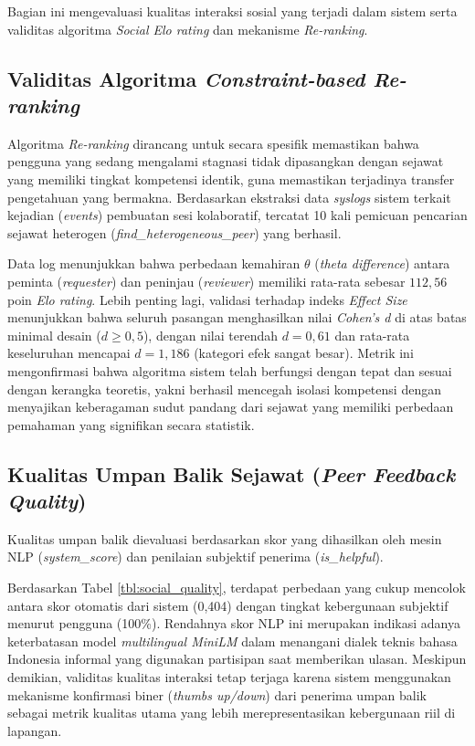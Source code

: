 Bagian ini mengevaluasi kualitas interaksi sosial yang terjadi dalam sistem serta validitas algoritma \textit{Social Elo rating} dan mekanisme \textit{Re-ranking}.

\subsection{Validitas Algoritma \textit{Constraint-based Re-ranking}}
Algoritma \textit{Re-ranking} dirancang untuk secara spesifik memastikan bahwa pengguna yang sedang mengalami stagnasi tidak dipasangkan dengan sejawat yang memiliki tingkat kompetensi identik, guna memastikan terjadinya transfer pengetahuan yang bermakna. Berdasarkan ekstraksi data \textit{syslogs} sistem terkait kejadian (\textit{events}) pembuatan sesi kolaboratif, tercatat 10 kali pemicuan pencarian sejawat heterogen (\textit{find\_heterogeneous\_peer}) yang berhasil. 

Data log menunjukkan bahwa perbedaan kemahiran $\theta$ (\textit{theta difference}) antara peminta (\textit{requester}) dan peninjau (\textit{reviewer}) memiliki rata-rata sebesar $112,56$ poin \textit{Elo rating}. Lebih penting lagi, validasi terhadap indeks \textit{Effect Size} menunjukkan bahwa seluruh pasangan menghasilkan nilai \textit{Cohen's d} di atas batas minimal desain ($d \geq 0,5$), dengan nilai terendah $d = 0,61$ dan rata-rata keseluruhan mencapai $d = 1,186$ (kategori efek sangat besar). Metrik ini mengonfirmasi bahwa algoritma sistem telah berfungsi dengan tepat dan sesuai dengan kerangka teoretis, yakni berhasil mencegah isolasi kompetensi dengan menyajikan keberagaman sudut pandang dari sejawat yang memiliki perbedaan pemahaman yang signifikan secara statistik.

\subsection{Kualitas Umpan Balik Sejawat (\textit{Peer Feedback Quality})}
Kualitas umpan balik dievaluasi berdasarkan skor yang dihasilkan oleh mesin NLP (\textit{system\_score}) dan penilaian subjektif penerima (\textit{is\_helpful}).



Berdasarkan Tabel \ref{tbl:social_quality}, terdapat perbedaan yang cukup mencolok antara skor otomatis dari sistem (0,404) dengan tingkat kebergunaan subjektif menurut pengguna (100\%). Rendahnya skor NLP ini merupakan indikasi adanya keterbatasan model \textit{multilingual MiniLM} dalam menangani dialek teknis bahasa Indonesia informal yang digunakan partisipan saat memberikan ulasan. Meskipun demikian, validitas kualitas interaksi tetap terjaga karena sistem menggunakan mekanisme konfirmasi biner (\textit{thumbs up/down}) dari penerima umpan balik sebagai metrik kualitas utama yang lebih merepresentasikan kebergunaan riil di lapangan.

